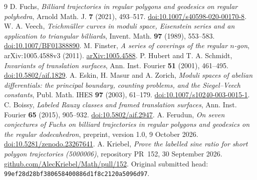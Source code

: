 \documentclass[11pt]{article}
\begin{document}
\begin{thebibliography}{9}
 D. Fuchs, \emph{Billiard trajectories in regular polygons and geodesics on regular polyhedra}, Arnold Math. J. \textbf{7} (2021), 493--517.
\href{https://doi.org/10.1007/s40598-020-00170-8}{doi:10.1007/s40598-020-00170-8}.
 W. A. Veech, \emph{Teichm\"uller curves in moduli space, Eisenstein series and an application to triangular billiards}, Invent. Math. \textbf{97} (1989), 553--583.
\href{https://doi.org/10.1007/BF01388890}{doi:10.1007/BF01388890}.
 M. Finster, \emph{A series of coverings of the regular \(n\)-gon}, arXiv:1005.4588v3 (2011).
\href{https://arxiv.org/abs/1005.4588}{arXiv:1005.4588}.
 P. Hubert and T. A. Schmidt, \emph{Invariants of translation surfaces}, Ann. Inst. Fourier \textbf{51} (2001), 461--495.
\href{https://doi.org/10.5802/aif.1829}{doi:10.5802/aif.1829}.
 A. Eskin, H. Masur and A. Zorich, \emph{Moduli spaces of abelian differentials: the principal boundary, counting problems, and the Siegel--Veech constants}, Publ. Math. IHES \textbf{97} (2003), 61--179.
\href{https://doi.org/10.1007/s10240-003-0015-1}{doi:10.1007/s10240-003-0015-1}.
 C. Boissy, \emph{Labeled Rauzy classes and framed translation surfaces}, Ann. Inst. Fourier \textbf{65} (2015), 905--932.
\href{https://doi.org/10.5802/aif.2947}{doi:10.5802/aif.2947}.
 A. Ferudun, \emph{On seven conjectures of Fuchs on billiard trajectories in regular polygons and geodesics on the regular dodecahedron}, preprint, version 1.0, 9 October 2026.
\href{https://doi.org/10.5281/zenodo.23267641}{doi:10.5281/zenodo.23267641}.
 A. Kriebel, \emph{Prove the labelled sine ratio for short polygon trajectories (5000006)}, repository PR~152, 30 September 2026.
\href{https://github.com/AlecKriebel/Math/pull/152}{github.com/AlecKriebel/Math/pull/152}.
Original submitted head: \texttt{99ef28d28bf380658400886d1f8c2120a5096d97}.
\end{thebibliography}
\end{document}
